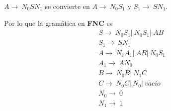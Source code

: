 \documentclass{article}
\begin{document}
\begin{enumerate}
\begin{enumerate}
        $A \rightarrow \ N_0SN_1$ se convierte en $A \rightarrow \ N_0S_1$ y 
        $S_1 \rightarrow \ SN_1$.

        Por lo que la gramática en \textbf{FNC} es 
        \begin{align*}
            &S \rightarrow \ N_0S_1 |\ N_0S_1 |\ AB \\
            &S_1 \rightarrow \ SN_1 \\
            &A \rightarrow \ N_1A_1 | \ AB |\ N_0S_1 \\
            &A_1 \rightarrow \ AN_0 \\
            &B \rightarrow \ N_0B |\ N_1C \\
            &C \rightarrow \ N_0C |\ N_0 |\ vacio \\
            &N_0 \rightarrow \ 0 \\
            &N_1 \rightarrow \ 1
        \end{align*}
    \end{enumerate}
\end{enumerate}
\end{document}
